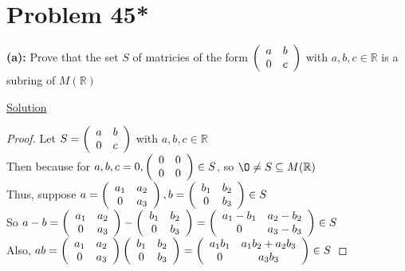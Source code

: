 \documentclass{article} %
\begin{document}
\newpage

\section*{Problem 45*}


\textbf{(a): }Prove that the set $S$ of matricies of the form $\left( \begin{array}{c c} a & b \\ 0 & c \end{array} \right)$ with $a,b,c \in \mathbb{R}$ is a subring of $M(\mathbb{R})$
\\
\begin{addmargin}[1em]{0em}
\underline{Solution}
\begin{addmargin}[1em]{0em}
\begin{proof}
Let $S = \left( \begin{array}{c c} a & b \\ 0 & c \end{array} \right)$ with $a,b,c \in \mathbb{R}$
\\Then because for $a,b,c = 0, \left( \begin{array}{c c} 0 & 0 \\ 0 & 0 \end{array} \right) \in S$, so $\O \neq S \subseteq M(\mathbb{R})$
\\Thus, suppose $a = \left( \begin{array}{c c} a_1 & a_2 \\ 0 & a_3 \end{array} \right), b = \left( \begin{array}{c c} b_1 & b_2 \\ 0 & b_3 \end{array} \right) \in S$
\\So $a - b =  \left( \begin{array}{c c} a_1 & a_2 \\ 0 & a_3 \end{array} \right) - \left( \begin{array}{c c} b_1 & b_2 \\ 0 & b_3 \end{array} \right) = \left( \begin{array}{c c} a_1 - b_1 & a_2 - b_2 \\ 0 & a_3 - b_3 \end{array} \right) \in S$
\\Also,  $ab =  \left( \begin{array}{c c} a_1 & a_2 \\ 0 & a_3 \end{array} \right) \left( \begin{array}{c c} b_1 & b_2 \\ 0 & b_3 \end{array} \right) = \left( \begin{array}{c c} a_1 b_1 &a_1b_2 + a_2b_3 \\ 0 & a_3 b_3 \end{array} \right) \in S$

\end{proof}
\end{addmargin}
\end{addmargin}
\end{document}

